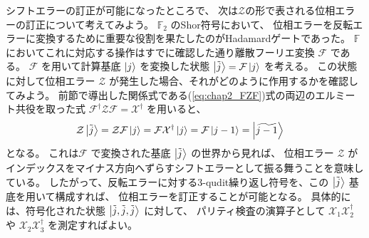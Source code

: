 \documentclass[../master.tex]{subfiles}
\begin{document}
シフトエラーの訂正が可能になったところで、
次は$\mathcal{Z}$の形で表される位相エラーの訂正について考えてみよう。
$\mathbb{F}_2$ のShor符号において、
位相エラーを反転エラーに変換するために重要な役割を果たしたのがHadamardゲートであった。
$\mathbb{F}$ においてこれに対応する操作はすでに確認した通り離散フーリエ変換 $\mathcal{F}$ である。
$\mathcal{F}$ を用いて計算基底 $\ket{j}$ を変換した状態 $\ket{\tilde{j}} = \mathcal{F} \ket{j}$ を考える。
この状態に対して位相エラー $\mathcal{Z}$ が発生した場合、それがどのように作用するかを確認してみよう。
前節で導出した関係式である(\ref{eq:chap2_FZF})式の両辺のエルミート共役を取った式
$\mathcal{F}^\dagger \mathcal{Z} \mathcal{F} = \mathcal{X}^\dagger$ を用いると、
\begin{equation}\begin{aligned}[b]
    \mathcal{Z} \ket{\tilde{j}} &= \mathcal{Z} \mathcal{F} \ket{j}
    = \mathcal{F} \mathcal{X}^\dagger \ket{j}
    = \mathcal{F} \ket{j-1}
    = \ket{\widetilde{j-1}}
\end{aligned}\end{equation}
となる。
これは$\mathcal{F}$ で変換された基底 $\ket{\tilde{j}}$ の世界から見れば、
位相エラー $\mathcal{Z}$ がインデックスをマイナス方向へずらすシフトエラーとして振る舞うことを意味している。
したがって、反転エラーに対する3-qudit繰り返し符号を、この $\ket{\tilde{j}}$ 基底を用いて構成すれば、
位相エラーを訂正することが可能となる。
具体的には、符号化された状態 $\ket{\tilde{j}, \tilde{j}, \tilde{j}}$ に対して、
パリティ検査の演算子として $\mathcal{X}_1 \mathcal{X}_2^\dagger$ や $\mathcal{X}_2 \mathcal{X}_3^\dagger$ を測定すればよい。
\end{document}
